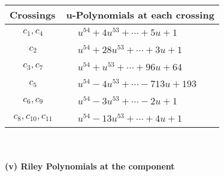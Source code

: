 \documentclass[1p]{elsarticle_modified}
\theoremstyle{definition}
\begin{document}
\begin{tabular}{m{50pt}|m{274pt}}
Crossings & \hspace{64pt}u-Polynomials at each crossing \\
\hline $$\begin{aligned}c_{1},c_{4}\end{aligned}$$&$\begin{aligned}
&u^{54}+4 u^{53}+\cdots+5 u+1
\end{aligned}$\\
\hline $$\begin{aligned}c_{2}\end{aligned}$$&$\begin{aligned}
&u^{54}+28 u^{53}+\cdots+3 u+1
\end{aligned}$\\
\hline $$\begin{aligned}c_{3},c_{7}\end{aligned}$$&$\begin{aligned}
&u^{54}+u^{53}+\cdots+96 u+64
\end{aligned}$\\
\hline $$\begin{aligned}c_{5}\end{aligned}$$&$\begin{aligned}
&u^{54}-4 u^{53}+\cdots-713 u+193
\end{aligned}$\\
\hline $$\begin{aligned}c_{6},c_{9}\end{aligned}$$&$\begin{aligned}
&u^{54}-3 u^{53}+\cdots-2 u+1
\end{aligned}$\\
\hline $$\begin{aligned}c_{8},c_{10},c_{11}\end{aligned}$$&$\begin{aligned}
&u^{54}-13 u^{53}+\cdots+4 u+1
\end{aligned}$\\
\hline
\end{tabular}\\~\\
\newpage\renewcommand{\arraystretch}{1}
\flushleft \textbf{(v) Riley Polynomials at the component}\newline \\
\end{document}
